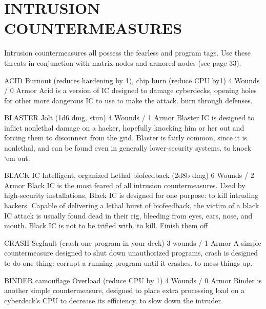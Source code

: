 \documentclass[oneside,10pt]{article}
\begin{document}
\newpage
\section{INTRUSION COUNTERMEASURES}
\begin{multicols}{2}
Intrusion countermeasures all possess the fearless and program tags. Use these threats in conjunction with matrix nodes
and armored nodes (see page 33).

\critterspec
{ACID}
{}
{Burnout (reduces hardening by 1), chip burn (reduce CPU by1)}
{4 Wounds / 0 Armor}
{Acid is a version of IC designed to damage cyberdecks, opening holes for other more dangerous IC to use to make the attack.}
{burn through defenses.}
{}

\critterspec
{BLASTER}
{}
{Jolt (1d6 dmg, stun)}
{4 Wounds / 1 Armor}
{Blaster IC is designed to inflict nonlethal damage on a hacker, hopefully knocking him or her out and forcing them to disconnect from the grid. Blaster is fairly common, since it is nonlethal, and can be found even in generally lower-security systems. }
{to knock ‘em out.}
{}

\critterspec
{BLACK IC}
{Intelligent, organized}
{Lethal biofeedback (2d8b dmg)}
{6 Wounds / 2 Armor}
{Black IC is the most feared of all intrusion countermeasures. Used by high-security installations, Black IC is designed for one purpose: to kill intruding hackers. Capable of delivering a lethal burst of biofeedback, the victim of a black IC attack is usually found dead in their rig, bleeding from eyes, ears, nose, and mouth. Black IC is not to be trifled with.}
{to kill.}
{\tcirc{} Finish them off}


\critterspec
{CRASH}
{}
{Segfault (crash one program in your deck)}
{3 wounds / 1 Armor}
{A simple countermeasure designed to shut down unauthorized programs, crash is designed to do one thing: corrupt a running program until it crashes. }
{to mess things up.}
{}

\critterspec
{BINDER}
{camouflage}
{Overload (reduce CPU by 1)}
{4 Wounds / 0 Armor}
{Binder is another simple countermeasure, designed to place extra processing load on a cyberdeck’s CPU to decrease its efficiency. }
{to slow down the intruder.}
{}

\end{multicols}

\newpage
\end{document}
